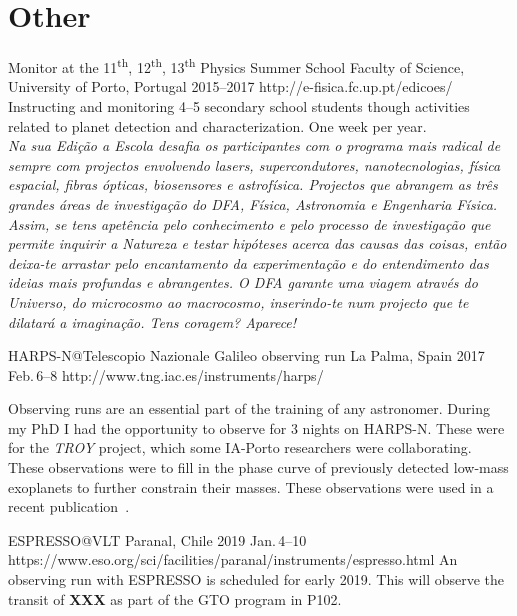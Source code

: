 \section{Other}\label{app_sec:other}

{Monitor at the 11\textsuperscript{th}, 12\textsuperscript{th}, 13\textsuperscript{th} Physics Summer School}
{Faculty of Science, University of Porto, Portugal}%
{2015--2017}%
{http://e-fisica.fc.up.pt/edicoes/}%
{}%
{Instructing and monitoring 4--5 secondary school students though activities related to planet detection and characterization.
One week per year.\\
  \emph{Na sua Edição a Escola desafia os participantes com o programa mais radical de sempre com projectos envolvendo lasers, supercondutores, nanotecnologias, física espacial, fibras ópticas, biosensores e astrofísica.
      Projectos que abrangem as três grandes áreas de investigação do DFA, Física, Astronomia e Engenharia Física.
      Assim, se tens apetência pelo conhecimento e pelo processo de investigação que permite inquirir a Natureza e testar hipóteses acerca das causas das coisas, então deixa-te arrastar pelo encantamento da experimentação e do entendimento das ideias mais profundas e abrangentes.
      O DFA garante uma viagem através do Universo, do microcosmo ao macrocosmo, inserindo-te num projecto que te dilatará a imaginação.
Tens coragem? Aparece!}}%


{HARPS-N@Telescopio Nazionale Galileo observing run}
{La Palma, Spain}%
{2017 Feb.\,6--8}%
{http://www.tng.iac.es/instruments/harps/}%
{}%
{Observing runs are an essential part of the training of any astronomer.
    During my PhD I had the opportunity to observe for 3 nights on {HARPS-N}.
    These were for the \emph{TROY} project, which some IA-Porto researchers were collaborating.
    These observations were to fill in the phase curve of previously detected low-mass exoplanets to further constrain their masses.
These observations were used in a recent publication~\citet{lillo-box_troy_2018}.

}%


{ESPRESSO@VLT}
{Paranal, Chile} %
{2019 Jan.\,4--10} %
{https://www.eso.org/sci/facilities/paranal/instruments/espresso.html}%
{}%
{An observing run with ESPRESSO is scheduled for early 2019.
This will observe the transit of \textbf{XXX} as part of the GTO program in P102.}

